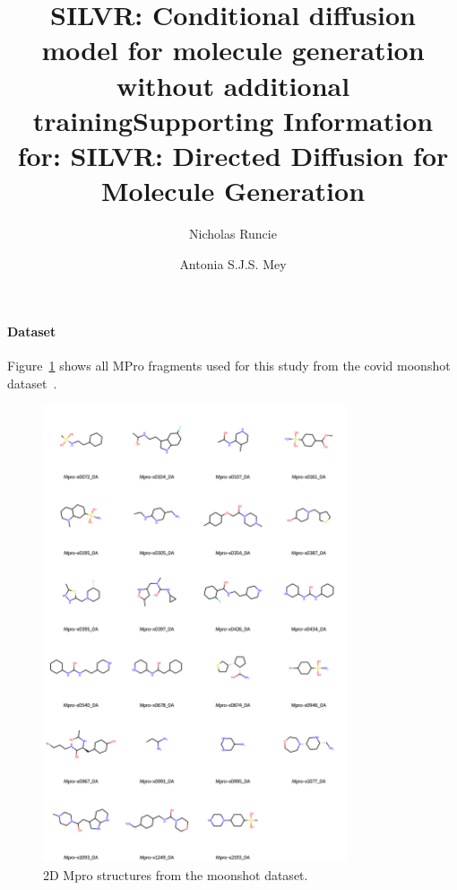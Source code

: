 \documentclass[journal=jacsat,manuscript=article]{achemso}
\author{Nicholas Runcie}
\author{Antonia S.J.S. Mey}
\title[SILVR: Molecular Generation for binding modes]
  {SILVR: Conditional diffusion model for molecule generation without additional training}
\title[SILVR: Molecular Generation for binding modes]
  {Supporting Information for: SILVR: Directed Diffusion for Molecule Generation}
\begin{document}
\begin{suppinfo}


\paragraph{Dataset}
Figure~\ref{fig:fragments} shows all MPro fragments used for this study from the covid moonshot dataset~\cite{consortium2021open,consortium2023open}.

\begin{figure}
    \centering
    \includegraphics[width=0.8\textwidth]{paper/Figures/FigS1/mpro_ligands_grid_2d.png}
    \caption{2D Mpro structures from the moonshot dataset.}
    \label{fig:fragments}
\end{figure}
\newpage

\end{suppinfo}
\end{document}

